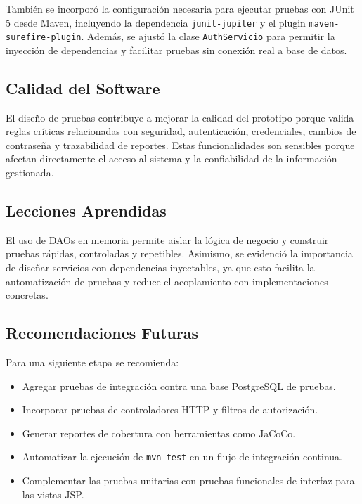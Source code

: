 \documentclass[12pt,a4paper]{article}
\begin{document}
También se incorporó la configuración necesaria para ejecutar pruebas con JUnit 5 desde Maven, incluyendo la dependencia \texttt{junit-jupiter} y el plugin \texttt{maven-surefire-plugin}. Además, se ajustó la clase \texttt{AuthServicio} para permitir la inyección de dependencias y facilitar pruebas sin conexión real a base de datos.

\subsection{Calidad del Software}

El diseño de pruebas contribuye a mejorar la calidad del prototipo porque valida reglas críticas relacionadas con seguridad, autenticación, credenciales, cambios de contraseña y trazabilidad de reportes. Estas funcionalidades son sensibles porque afectan directamente el acceso al sistema y la confiabilidad de la información gestionada.

\subsection{Lecciones Aprendidas}

El uso de DAOs en memoria permite aislar la lógica de negocio y construir pruebas rápidas, controladas y repetibles. Asimismo, se evidenció la importancia de diseñar servicios con dependencias inyectables, ya que esto facilita la automatización de pruebas y reduce el acoplamiento con implementaciones concretas.

\subsection{Recomendaciones Futuras}

Para una siguiente etapa se recomienda:

\begin{itemize}[leftmargin=*]
    \item Agregar pruebas de integración contra una base PostgreSQL de pruebas.
    \item Incorporar pruebas de controladores HTTP y filtros de autorización.
    \item Generar reportes de cobertura con herramientas como JaCoCo.
    \item Automatizar la ejecución de \texttt{mvn test} en un flujo de integración continua.
    \item Complementar las pruebas unitarias con pruebas funcionales de interfaz para las vistas JSP.
\end{itemize}
\end{document}
